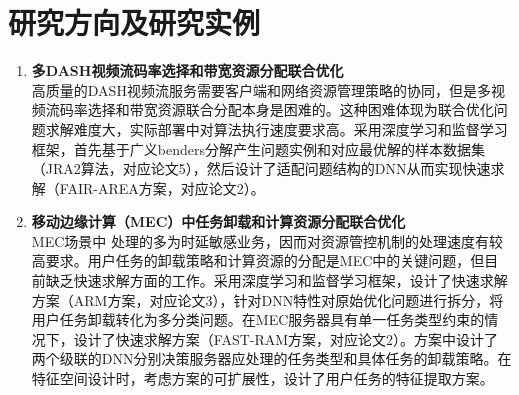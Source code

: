 \documentclass{resume}
\begin{document}
\section{研究方向及研究实例}
\begin{enumerate}
  \item \textbf{多DASH视频流码率选择和带宽资源分配联合优化}
  \\ 高质量的DASH视频流服务需要客户端和网络资源管理策略的协同，但是多视频流码率选择和带宽资源联合分配本身是困难的。这种困难体现为联合优化问题求解难度大，实际部署中对算法执行速度要求高。采用深度学习和监督学习框架，首先基于广义benders分解产生问题实例和对应最优解的样本数据集（JRA2算法，对应论文5），然后设计了适配问题结构的DNN从而实现快速求解（FAIR-AREA方案，对应论文2）。
  \item \textbf{移动边缘计算（MEC）中任务卸载和计算资源分配联合优化}
  \\ MEC场景中 处理的多为时延敏感业务，因而对资源管控机制的处理速度有较高要求。用户任务的卸载策略和计算资源的分配是MEC中的关键问题，但目前缺乏快速求解方面的工作。采用深度学习和监督学习框架，设计了快速求解方案（ARM方案，对应论文3），针对DNN特性对原始优化问题进行拆分，将用户任务卸载转化为多分类问题。在MEC服务器具有单一任务类型约束的情况下，设计了快速求解方案（FAST-RAM方案，对应论文2）。方案中设计了两个级联的DNN分别决策服务器应处理的任务类型和具体任务的卸载策略。在特征空间设计时，考虑方案的可扩展性，设计了用户任务的特征提取方案。
\end{enumerate}
\end{document}
